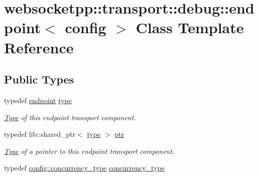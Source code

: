 \hypertarget{classwebsocketpp_1_1transport_1_1debug_1_1endpoint}{}\section{websocketpp\+:\+:transport\+:\+:debug\+:\+:endpoint$<$ config $>$ Class Template Reference}
\label{classwebsocketpp_1_1transport_1_1debug_1_1endpoint}
\subsection*{Public Types}
\begin{DoxyCompactItemize}
\item 
\mbox{\label{classwebsocketpp_1_1transport_1_1debug_1_1endpoint_ad8bdfc73f0351c08dbe64143cd224ac0}} 
typedef \mbox{\hyperlink{classwebsocketpp_1_1transport_1_1debug_1_1endpoint}{endpoint}} \mbox{\hyperlink{classwebsocketpp_1_1transport_1_1debug_1_1endpoint_ad8bdfc73f0351c08dbe64143cd224ac0}{type}}
\begin{DoxyCompactList}\small\item\em \mbox{\hyperlink{struct_type}{Type}} of this endpoint transport component. \end{DoxyCompactList}\item 
\mbox{\label{classwebsocketpp_1_1transport_1_1debug_1_1endpoint_a947f3252f16c34680638f0ed9ef95aa3}} 
typedef lib\+::shared\+\_\+ptr$<$ \mbox{\hyperlink{classwebsocketpp_1_1transport_1_1debug_1_1endpoint_ad8bdfc73f0351c08dbe64143cd224ac0}{type}} $>$ \mbox{\hyperlink{classwebsocketpp_1_1transport_1_1debug_1_1endpoint_a947f3252f16c34680638f0ed9ef95aa3}{ptr}}
\begin{DoxyCompactList}\small\item\em \mbox{\hyperlink{struct_type}{Type}} of a pointer to this endpoint transport component. \end{DoxyCompactList}\item 
\mbox{\label{classwebsocketpp_1_1transport_1_1debug_1_1endpoint_adbe41c60a84f148cbdce15a0535ac2e9}} 
typedef \mbox{\hyperlink{classwebsocketpp_1_1concurrency_1_1none}{config\+::concurrency\+\_\+type}} \mbox{\hyperlink{classwebsocketpp_1_1transport_1_1debug_1_1endpoint_adbe41c60a84f148cbdce15a0535ac2e9}{concurrency\+\_\+type}}

\end{DoxyCompactItemize}
